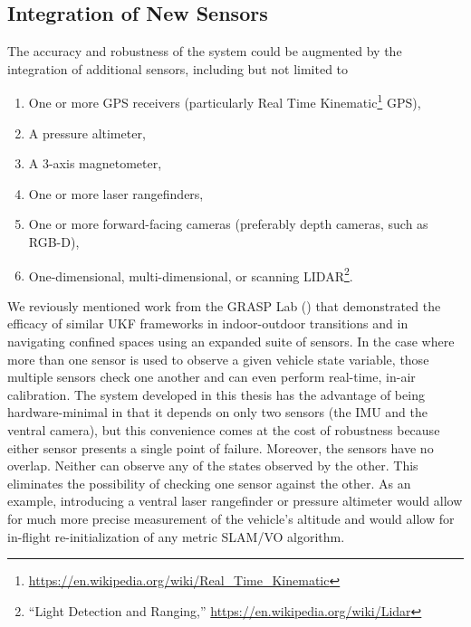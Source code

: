 \subsection{Integration of New Sensors}
The accuracy and robustness of the system could be augmented by the integration of additional sensors, including but not limited to
\begin{enumerate}
    \item One or more GPS receivers (particularly Real Time Kinematic\footnote{\url{https://en.wikipedia.org/wiki/Real_Time_Kinematic}} GPS),
    \item A pressure altimeter,
    \item A 3-axis magnetometer,
    \item One or more laser rangefinders,
    \item One or more forward-facing cameras (preferably depth cameras, such as RGB-D),
    \item One-dimensional, multi-dimensional, or scanning LIDAR\footnote{``Light Detection and Ranging,'' \url{https://en.wikipedia.org/wiki/Lidar}}.
\end{enumerate}
We reviously mentioned work from the GRASP Lab (\cite{Shen2011}) that demonstrated the efficacy of similar UKF frameworks in indoor-outdoor transitions and in navigating confined spaces using an expanded suite of sensors. In the case where more than one sensor is used to observe a given vehicle state variable, those multiple sensors check one another and can even perform real-time, in-air calibration. The system developed in this thesis has the advantage of being hardware-minimal in that it depends on only two sensors (the IMU and the ventral camera), but this convenience comes at the cost of robustness because either sensor presents a single point of failure. Moreover, the sensors have no overlap. Neither can observe any of the states observed by the other. This eliminates the possibility of checking one sensor against the other. As an example, introducing a ventral laser rangefinder or pressure altimeter would allow for much more precise measurement of the vehicle's altitude and would allow for in-flight re-initialization of any metric SLAM/VO algorithm.

